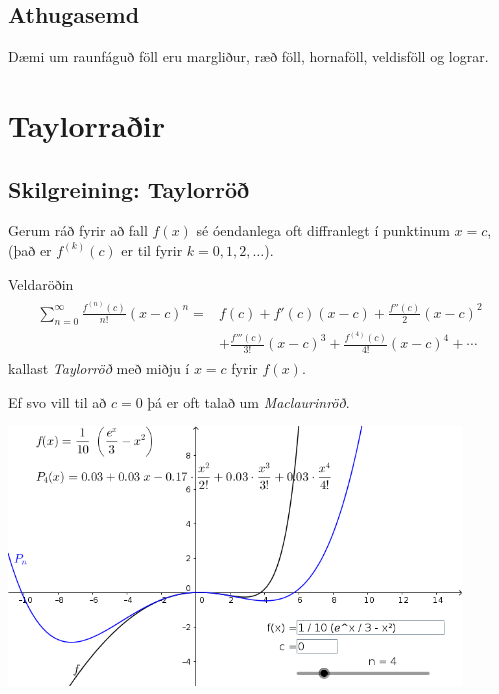 \documentclass[b5paper,11pt,icelandic]{sphinxmanual}
\begin{document}
\subsection{Athugasemd}
\label{kafli10:athugasemd}
Dæmi um raunfáguð föll eru margliður, ræð föll, hornaföll, veldisföll og
lograr.


\section{Taylorraðir}
\label{kafli10:taylorrair}\label{kafli10:index-6}

\subsection{Skilgreining: Taylorröð}
\label{kafli10:skilgreining-taylorro}
Gerum ráð fyrir að fall \(f(x)\) sé óendanlega oft diffranlegt í
punktinum \(x=c\), (það er \(f^{(k)}(c)\) er til fyrir
\(k=0, 1, 2, \ldots\)).

Veldaröðin
\begin{equation*}
\begin{split}\begin{aligned}
\sum_{n=0}^\infty \frac{f^{(n)}(c)}{n!}(x-c)^n = & f(c)+f'(c)(x-c)+
\frac{f''(c)}{2}(x-c)^2 \\ & + \frac{f'''(c)}{3!}(x-c)^3
+ \frac{f^{(4)}(c)}{4!}(x-c)^4 + \cdots \end{aligned}\end{split}
\end{equation*}
kallast \emph{Taylorröð} með miðju í \(x=c\) fyrir \(f(x)\).

Ef svo vill til að \(c=0\) þá er oft talað um \emph{Maclaurinröð}.


\begin{center}
\includegraphics[width=12cm,keepaspectratio=true]{03_Taylorrod.png}
\end{center}
\end{document}
